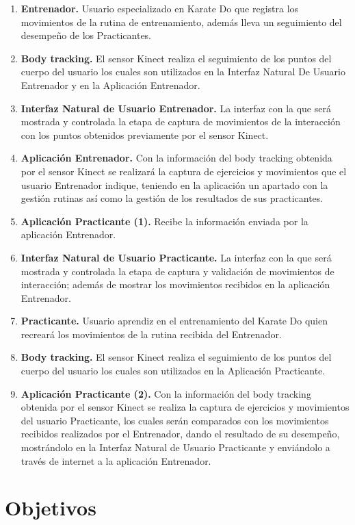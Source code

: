 \begin{enumerate}
	\item \textbf{Entrenador.} Usuario especializado en Karate Do que registra los movimientos de la rutina de entrenamiento, además lleva un seguimiento del desempeño de los Practicantes. 
	\item \textbf{Body tracking.} El sensor Kinect realiza el seguimiento de los puntos del cuerpo del usuario los cuales son utilizados en la Interfaz Natural De Usuario Entrenador y en la Aplicación Entrenador. 
	\item \textbf{Interfaz Natural de Usuario Entrenador.} La interfaz con la que será mostrada y controlada la etapa de captura de movimientos de la interacción con los puntos obtenidos previamente por el sensor Kinect. 
	\item \textbf{Aplicación Entrenador.} 
	Con la información del body tracking obtenida por el sensor Kinect se realizará la captura de ejercicios y movimientos que el usuario Entrenador indique, teniendo en la aplicación un apartado con la gestión rutinas así como la gestión de los resultados de sus practicantes. 
	\item \textbf{Aplicación Practicante (1).} Recibe la información enviada por la aplicación Entrenador. 
	\item \textbf{Interfaz Natural de Usuario Practicante.} La interfaz con la que será mostrada y controlada la etapa de captura y validación de movimientos de interacción; además de mostrar los movimientos recibidos en la aplicación Entrenador. 
	\item \textbf{Practicante.} Usuario aprendiz en el entrenamiento del Karate Do quien recreará los movimientos de la rutina recibida del Entrenador. 
	\item \textbf{Body tracking.} El sensor Kinect realiza el seguimiento de los puntos del cuerpo del usuario los cuales son utilizados en la Aplicación Practicante. 
	\item \textbf{Aplicación Practicante (2).} Con la información del body tracking obtenida por el sensor Kinect se realiza la captura de ejercicios y movimientos del usuario Practicante, los cuales serán comparados con los movimientos recibidos realizados por el Entrenador, dando el resultado de su desempeño, mostrándolo en la Interfaz Natural de Usuario Practicante y enviándolo a través de internet a la aplicación Entrenador.
\end{enumerate}
\section{Objetivos}
